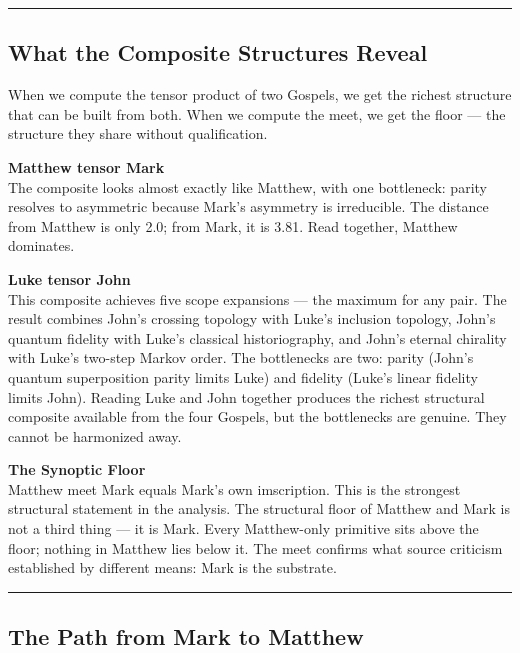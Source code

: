 \documentclass[12pt,a4paper]{article}
\begin{document}
\begin{center}
\rule{0.5\textwidth}{0.4pt}
\end{center}

\subsection{What the Composite Structures Reveal}

When we compute the tensor product of two Gospels, we get the richest structure that can be built from both. When we compute the meet, we get the floor --- the structure they share without qualification.

\textbf{Matthew tensor Mark} \\
The composite looks almost exactly like Matthew, with one bottleneck: parity resolves to asymmetric because Mark's asymmetry is irreducible. The distance from Matthew is only 2.0; from Mark, it is 3.81. Read together, Matthew dominates.

\textbf{Luke tensor John} \\
This composite achieves five scope expansions --- the maximum for any pair. The result combines John's crossing topology with Luke's inclusion topology, John's quantum fidelity with Luke's classical historiography, and John's eternal chirality with Luke's two-step Markov order. The bottlenecks are two: parity (John's quantum superposition parity limits Luke) and fidelity (Luke's linear fidelity limits John). Reading Luke and John together produces the richest structural composite available from the four Gospels, but the bottlenecks are genuine. They cannot be harmonized away.

\textbf{The Synoptic Floor} \\
Matthew meet Mark equals Mark's own imscription. This is the strongest structural statement in the analysis. The structural floor of Matthew and Mark is not a third thing --- it is Mark. Every Matthew-only primitive sits above the floor; nothing in Matthew lies below it. The meet confirms what source criticism established by different means: Mark is the substrate.

\begin{center}
\rule{0.5\textwidth}{0.4pt}
\end{center}

\subsection{The Path from Mark to Matthew}
\end{document}
